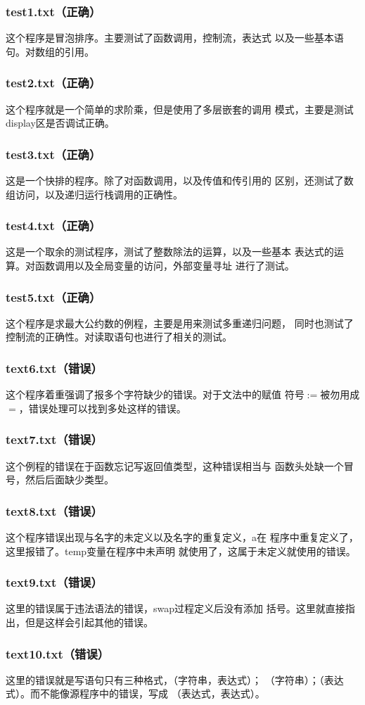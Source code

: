 \subsubsection{test1.txt（正确）}
这个程序是冒泡排序。主要测试了函数调用，控制流，表达式
以及一些基本语句。对数组的引用。
\subsubsection{test2.txt（正确）}
这个程序就是一个简单的求阶乘，但是使用了多层嵌套的调用
模式，主要是测试display区是否调试正确。
\subsubsection{test3.txt（正确）}
这是一个快排的程序。除了对函数调用，以及传值和传引用的
区别，还测试了数组访问，以及递归运行栈调用的正确性。
\subsubsection{test4.txt（正确）}
这是一个取余的测试程序，测试了整数除法的运算，以及一些基本
表达式的运算。对函数调用以及全局变量的访问，外部变量寻址
进行了测试。
\subsubsection{test5.txt（正确）}
这个程序是求最大公约数的例程，主要是用来测试多重递归问题，
同时也测试了控制流的正确性。对读取语句也进行了相关的测试。
\subsubsection{text6.txt（错误）}
这个程序着重强调了报多个字符缺少的错误。对于文法中的赋值
符号$:=$被勿用成$=$，错误处理可以找到多处这样的错误。
\subsubsection{text7.txt（错误）}
这个例程的错误在于函数忘记写返回值类型，这种错误相当与
函数头处缺一个冒号，然后后面缺少类型。
\subsubsection{text8.txt（错误）}
这个程序错误出现与名字的未定义以及名字的重复定义，a在
程序中重复定义了，这里报错了。temp变量在程序中未声明
就使用了，这属于未定义就使用的错误。
\subsubsection{text9.txt（错误）}
这里的错误属于违法语法的错误，swap过程定义后没有添加
括号。这里就直接指出，但是这样会引起其他的错误。
\subsubsection{text10.txt（错误）}
这里的错误就是写语句只有三种格式，（字符串，表达式）；
（字符串）；（表达式）。而不能像源程序中的错误，写成
（表达式，表达式）。
